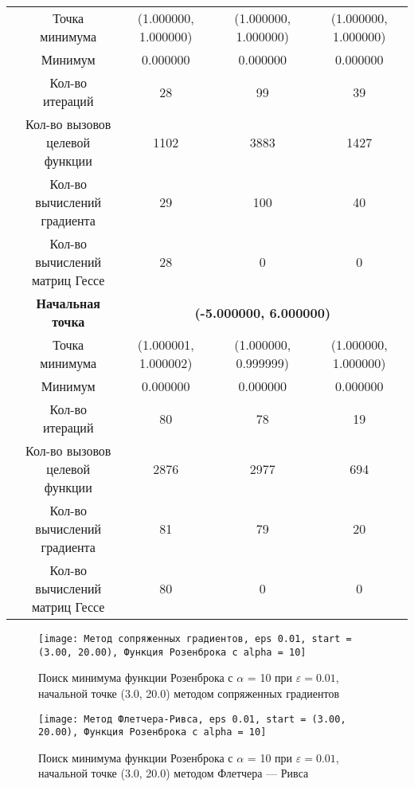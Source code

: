 \begin{table}[H]
\begin{tabular}{|c|c|c|c|c|}
	\cline{2-5}
	&Точка минимума &(1.000000, 1.000000) &(1.000000, 1.000000) &(1.000000, 1.000000) \\ 
	\cline{2-5}
	&Минимум &0.000000 &0.000000 &0.000000 \\ 
	\cline{2-5}
	&Кол-во итераций &28 &99 &39 \\ 
	\cline{2-5}
	&\makecell{Кол-во вызовов\\целевой функции} &1102 &3883 &1427 \\ 
	\cline{2-5}
	&\makecell{Кол-во вычислений\\градиента} &29 &100 &40 \\ 
	\cline{2-5}
	&\makecell{Кол-во вычислений\\матриц Гессе} &28 &0 &0 \\ 
	\cline{2-5}
\cline{2-5}&\textbf{Начальная точка} &\multicolumn{3}{c|}{\textbf{(-5.000000, 6.000000)}}\\
	\cline{2-5}
	&Точка минимума &(1.000001, 1.000002) &(1.000000, 0.999999) &(1.000000, 1.000000) \\ 
	\cline{2-5}
	&Минимум &0.000000 &0.000000 &0.000000 \\ 
	\cline{2-5}
	&Кол-во итераций &80 &78 &19 \\ 
	\cline{2-5}
	&\makecell{Кол-во вызовов\\целевой функции} &2876 &2977 &694 \\ 
	\cline{2-5}
	&\makecell{Кол-во вычислений\\градиента} &81 &79 &20 \\ 
	\cline{2-5}
	&\makecell{Кол-во вычислений\\матриц Гессе} &80 &0 &0 \\ 
	\cline{2-5}
	\hline

\end{tabular}
\end{table}


            \begin{figure}[H]
	        \centering
	        \texttt{[image: Метод сопряженных градиентов, eps 0.01, start = (3.00, 20.00), Функция Розенброка с alpha = 10]}%
	        \caption{Поиск минимума функции Розенброка с $\alpha$ = 10 при $\varepsilon = 0.01$, начальной точке (3.0, 20.0) методом сопряженных градиентов}
	        \vspace*{-1.2cm}
            \end{figure}
            
            \begin{figure}[H]
	        \centering
	        \texttt{[image: Метод Флетчера-Ривса, eps 0.01, start = (3.00, 20.00), Функция Розенброка с alpha = 10]}%
	        \caption{Поиск минимума функции Розенброка с $\alpha$ = 10 при $\varepsilon = 0.01$, начальной точке (3.0, 20.0) методом Флетчера --- Ривса}
	        \vspace*{-1.2cm}
            \end{figure}
            
